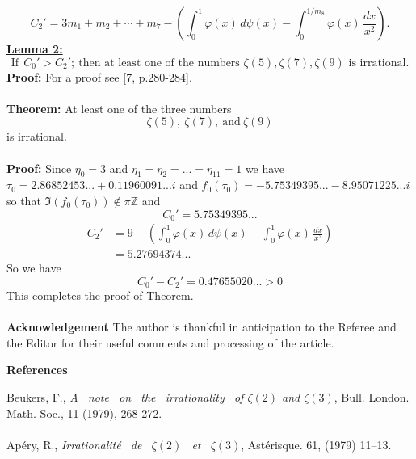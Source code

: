 \documentclass[12pt]{article}
\begin{document}
\begin{equation}
C_2'
=
3 m_1+m_2+\cdots+m_{7}
-
\left(
\int_0^1 \varphi(x)\,d\psi(x)
-
\int_0^{1/m_8}
\varphi(x)\,\frac{dx}{x^2}
\right).
\end{equation}
\textbf{\underline{Lemma 2:}} 
\begin{equation}
\text{If}\ \  C_0'>C_2';
\
\text{then at least one of the numbers }
\zeta(5),\zeta(7),\zeta(9)
\text{ is irrational.}
\end{equation}
 \textbf{Proof:} For a proof see [7, p.280-284].\\\\
\textbf{Theorem:} At least one of the three numbers \begin{equation*}
     \zeta(5), \ \zeta(7),\ \text{and} \ \zeta(9)  
 \end{equation*} is irrational.\\\\
 \textbf{Proof:} Since $\eta_0=3$ and $\eta_1=\eta_2=...=\eta_{11}=1$ we have $\tau_0 = 2.86852453...+0.11960091... i$ and $f_0(\tau_0)=-5.75349395...-8.95071225... i$ so that $\Im(f_0(\tau_0))\notin \pi\mathbb{Z}$ and \begin{equation}
     C_0' = 5.75349395...
 \end{equation}
 \begin{equation}
\begin{aligned}
C_2'
&=9-\left(
\int_0^1 \varphi(x)\,d\psi(x)
-\int_0^1\varphi(x)\,\frac{dx}{x^2}
\right)\\
&=5.27694374...
\end{aligned}
\end{equation}
So we have \begin{equation}
    C_0'-C_2'=0.47655020...>0
\end{equation}
This completes the proof of Theorem.\\\\
{\bf Acknowledgement} The author is thankful in anticipation to the Referee and the Editor for their useful comments and processing of the article.
\pagebreak
\begin{center}
{\bf References}
\end{center} 
\big[1\big] Beukers, F., {\it A \ note \ on \ the \ irrationality \ of $\zeta(2)$ and $\zeta(3)$}, Bull. London. Math. Soc., 11 (1979), 268-272.\\\\
\big[2\big] Apéry, R., {\it Irrationalité \ de \ $\zeta(2)$ \ et \ $\zeta(3)$}, Astérisque. 61, (1979) 11–13.
\\\\
\end{document}
